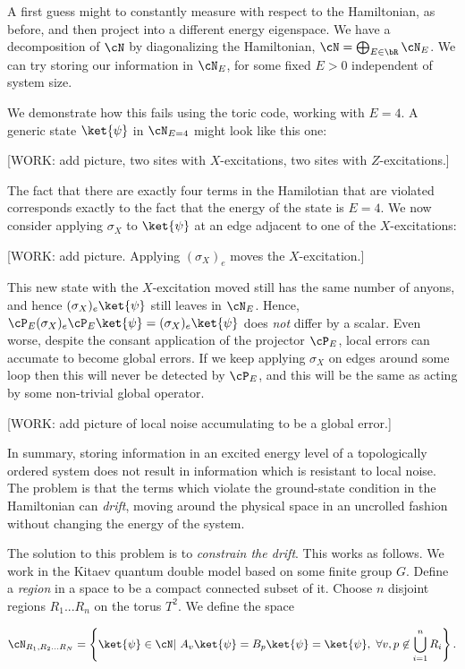 A first guess might to constantly measure with respect to the Hamiltonian, as before, and then project into a different energy eigenspace. We have a decomposition of $\cN$ by diagonalizing the Hamiltonian, $\cN=\bigoplus_{E\in \bR}\cN_{E}$. We can try storing our information in $\cN_{E}$, for some fixed $E>0$ independent of system size.

We demonstrate how this fails using the toric code, working with $E=4$. A generic state $\ket{\psi}$ in $\cN_{E=4}$ might look like this one:

[WORK: add picture, two sites with $X$-excitations, two sites with $Z$-excitations.]

The fact that there are exactly four terms in the Hamilotian that are violated corresponds exactly to the fact that the energy of the state is $E=4$. We now consider applying $\sigma_{X}$ to $\ket{\psi}$ at an edge adjacent to one of the $X$-excitations:

[WORK: add picture. Applying $(\sigma_X)_e$ moves the $X$-excitation.]

This new state with the $X$-excitation moved still has the same number of anyons, and hence $(\sigma_X)_e\ket{\psi}$ still leaves in $\cN_{E}$. Hence, $\cP_{E}(\sigma_X)_e\cP_{E}\ket{\psi}=(\sigma_X)_e\ket{\psi}$ does \textit{not} differ by a scalar. Even worse, despite the consant application of the projector $\cP_{E}$, local errors can accumate to become global errors. If we keep applying $\sigma_X$ on edges around some loop then this will never be detected by $\cP_{E}$, and this will be the same as acting by some non-trivial global operator. 

[WORK: add picture of local noise accumulating to be a global error.]

In summary, storing information in an excited energy level of a topologically ordered system does not result in information which is resistant to local noise. The problem is that the terms which violate the ground-state condition in the Hamiltonian can \textit{drift}, moving around the physical space in an uncrolled fashion without changing the energy of the system.

The solution to this problem is to \textit{constrain the drift}. This works as follows. We work in the Kitaev quantum double model based on some finite group $G$. Define a \textit{region} in a space to be a compact connected subset of it. Choose $n$ disjoint regions $R_1...R_n$ on the torus $T^2$. We define the space


$$\cN_{R_1,R_2... R_N}=\left\{\ket{\psi}\in \cN | \,\, A_v\ket{\psi}=B_p\ket{\psi}=\ket{\psi},\,\, \forall v,p\not\in \bigcup_{i=1}^n R_i \right\}.$$

